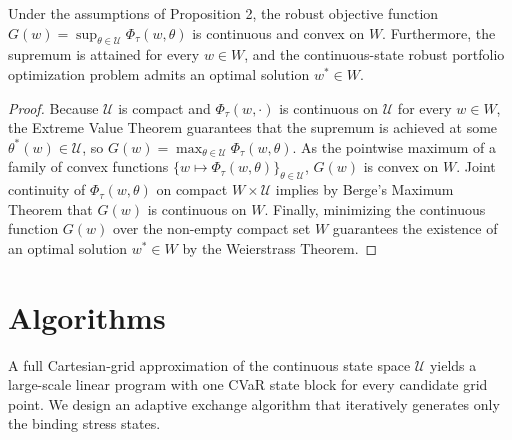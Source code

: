 \documentclass[smallextended]{svjour3}
\begin{document}
\begin{theorem}
Under the assumptions of Proposition 2, the robust objective function $G(w) = \sup_{\theta \in \mathcal{U}} \Phi_\tau(w, \theta)$ is continuous and convex on $W$. Furthermore, the supremum is attained for every $w \in W$, and the continuous-state robust portfolio optimization problem admits an optimal solution $w^* \in W$.
\end{theorem}

\begin{proof}
Because $\mathcal{U}$ is compact and $\Phi_\tau(w, \cdot)$ is continuous on $\mathcal{U}$ for every $w \in W$, the Extreme Value Theorem guarantees that the supremum is achieved at some $\theta^*(w) \in \mathcal{U}$, so $G(w) = \max_{\theta \in \mathcal{U}} \Phi_\tau(w, \theta)$. As the pointwise maximum of a family of convex functions $\{w \mapsto \Phi_\tau(w, \theta)\}_{\theta \in \mathcal{U}}$, $G(w)$ is convex on $W$. Joint continuity of $\Phi_\tau(w, \theta)$ on compact $W \times \mathcal{U}$ implies by Berge's Maximum Theorem that $G(w)$ is continuous on $W$. Finally, minimizing the continuous function $G(w)$ over the non-empty compact set $W$ guarantees the existence of an optimal solution $w^* \in W$ by the Weierstrass Theorem.
\end{proof}


\section{Algorithms}\label{sec:algorithms}
A full Cartesian-grid approximation of the continuous state space $\mathcal{U}$ yields a large-scale linear program with one CVaR state block for every candidate grid point. We design an adaptive exchange algorithm that iteratively generates only the binding stress states.
\end{document}
